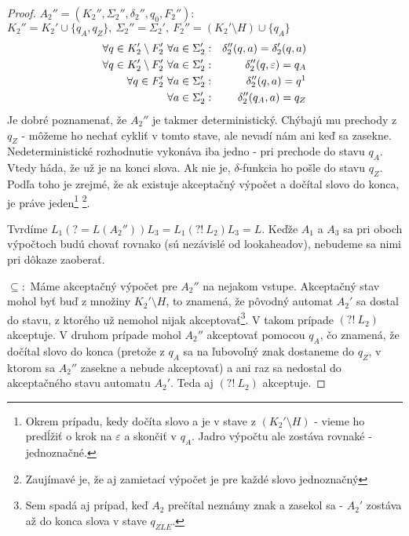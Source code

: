 \begin{proof}
$A_2''= (K_2'',\Sigma_2'',\delta_2'',q_{0},F_2'')$: $K_2'' = K_2' \cup \lbrace q_A, q_Z \rbrace, ~\Sigma_2'' = \Sigma_2', ~F_2'' = (K_2'\setminus H) \cup \lbrace q_A \rbrace$
\begin{eqnarray*}
 \forall q \in K_2' \setminus F_2'  ~ \forall a \in \Sigma_2' &:&  \delta_2''(q,a)=\delta_2'(q,a) \\
 \forall q \in K_2' \setminus F_2'  ~ \forall a \in \Sigma_2' &:&  \delta_2''(q,\varepsilon)=q_A \\
 \forall q \in F_2' ~ \forall a \in \Sigma_2' &:& \delta_2''(q,a)=q \footnotemark \\
 \forall a \in \Sigma_2' &:& \delta_2''(q_A,a)=q_Z 
\end{eqnarray*}
Je dobré poznamenať, že $A_2''$ je takmer deterministický. Chýbajú mu prechody z $q_Z$ - môžeme ho nechať cykliť v tomto stave, ale nevadí nám ani keď sa zasekne. Nedeterministické rozhodnutie vykonáva iba jedno - pri prechode do stavu $q_A$. Vtedy háda, že už je na konci slova. Ak nie je, $\delta$-funkcia ho pošle do stavu $q_Z$. Podľa toho je zrejmé, že ak existuje akceptačný výpočet a dočítal slovo do konca, je práve jeden\footnote{Okrem prípadu, kedy dočíta slovo a je v stave z $(K_2'\setminus H)$ - vieme ho predĺžiť o krok na $\varepsilon$ a skončiť v $q_A$. Jadro výpočtu ale zostáva rovnaké - jednoznačné.} \footnote{Zaujímavé je, že aj zamietací výpočet je pre každé slovo jednoznačný}.

Tvrdíme $ L_1(?=L(A_2''))L_3 =L_1(?!~L_2)L_3= L $.
Keďže $A_1$ a $A_3$ sa pri oboch výpočtoch budú chovať rovnako (sú nezávislé od lookaheadov), nebudeme sa nimi pri dôkaze zaoberať.

$\subseteq :$ Máme akceptačný výpočet pre $A_2''$ na nejakom vstupe. Akceptačný stav mohol byť buď z množiny $K_2'\setminus H$, to znamená, že pôvodný automat $A_2'$ sa dostal do stavu, z ktorého už nemohol nijak akceptovať\footnote{Sem spadá aj prípad, keď $A_2$ prečítal neznámy znak a zasekol sa - $A_2'$ zostáva až do konca slova v stave $q_{ZLE}$.}. V takom prípade $(?!~L_2)$ akceptuje. V druhom prípade mohol $A_2''$ akceptovať pomocou $q_A$, čo znamená, že dočítal slovo do konca (pretože z $q_A$ sa na ľubovoľný znak dostaneme do $q_Z$, v ktorom sa $A_2''$ zasekne a nebude akceptovať) a ani raz sa nedostal do akceptačného stavu automatu $A_2'$. Teda aj $(?!~L_2)$ akceptuje.


\end{proof}
